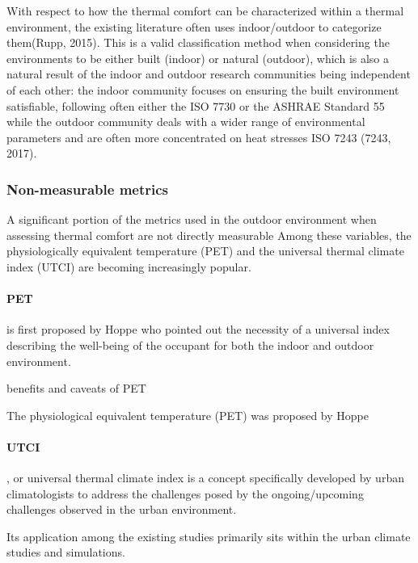 With respect to how the thermal comfort can be characterized within a thermal environment, the existing literature often uses indoor/outdoor to categorize them(Rupp, 2015). This is a valid classification method when considering the environments to be either built (indoor) or natural (outdoor), which is also a natural result of the indoor and outdoor research communities being independent of each other: the indoor community focuses on ensuring the built environment satisfiable, following often either the ISO 7730 \cite{iso_iso_2005} or the ASHRAE Standard 55 \cite{ansi/ashrae_standard_2017} while the outdoor community deals with a wider range of environmental parameters and are often more concentrated on heat stresses ISO 7243 (7243, 2017). 

\subsubsection{Non-measurable metrics}
    A significant portion of the metrics used in the outdoor environment when assessing thermal comfort are not directly measurable
    Among these variables, the physiologically equivalent temperature (PET) and the universal thermal climate index (UTCI) are becoming increasingly popular.
    \paragraph{PET} is first proposed by Hoppe who pointed out the necessity of a universal index describing the well-being of the occupant for both the indoor and outdoor environment. 
    
    benefits and caveats of PET
    

    The physiological equivalent temperature (PET) was proposed by Hoppe\cite{h._hoppe_new_1992}   
    \paragraph{UTCI}, or universal thermal climate index is a concept specifically developed by urban climatologists to address the challenges posed by the ongoing/upcoming challenges observed in the urban environment.
    
    Its application among the existing studies primarily sits within the urban climate studies and simulations.
    
